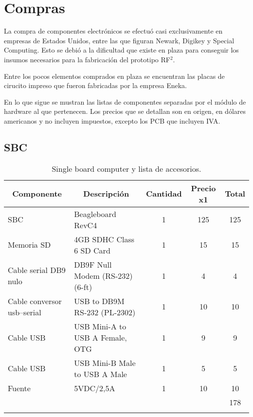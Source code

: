 \chapter{Compras}

La compra de componentes electrónicos se efectuó casi exclusivamente en empresas 
de Estados Unidos, entre las que figuran Newark, Digikey y Special Computing. Esto
se debió a la dificultad que existe en plaza para conseguir los insumos
necesarios para la fabricación del prototipo RF$^{2}$. 

Entre los pocos elementos comprados en plaza se encuentran las placas de cirucito
impreso que fueron fabricadas por la empresa Eneka. 

En lo que sigue se mustran las listas de componentes separadas por el módulo de 
hardware al que pertenecen. Los precios que se detallan son en origen,
en dólares americanos y no incluyen impuestos, excepto los PCB que incluyen IVA.


\section{SBC}
\begin{longtable}{|l|l|c|c|c|}
\hline
\multicolumn{1}{|c|}{\textbf{Componente}} & \multicolumn{1}{c|}{\textbf{Descripción}} & \textbf{Cantidad} & \textbf{Precio x1} & \textbf{Total} \\ \hline
SBC & Beagleboard  RevC4 & 1 & 125 & 125 \\ \hline
Memoria SD & 4GB SDHC Class 6 SD Card & 1 & 15 & 15 \\ \hline
Cable serial DB9 nulo & DB9F Null Modem (RS-232) (6-ft) & 1 & 4 & 4 \\ \hline
Cable conversor usb–serial & USB to DB9M RS-232 (PL-2302) & 1 & 10 & 10 \\ \hline
Cable USB & USB Mini-A to USB A Female, OTG & 1 & 9 & 9 \\ \hline
Cable USB & USB Mini-B Male to USB A Male & 1 & 5 & 5 \\ \hline
Fuente  & 5VDC/2,5A & 1 & 10 & 10 \\ \hline
 &  & \multicolumn{1}{l|}{} & \multicolumn{1}{l|}{} & 178 \\ \hline
\caption{Single board computer y lista de accesorios.}
\label{}
\end{longtable}

\newpage
